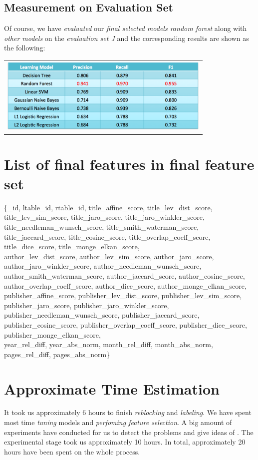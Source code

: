\documentclass[10pt, oneside]{article}
\begin{document}
\subsection*{Measurement on Evaluation Set}
Of course, we have \textit{evaluated} our \textit{final selected models random forest} along with \textit{other models}  on the \textit{evaluation set J} and the corresponding results are shown as the following:
\begin{table}[H]
\begin{tabular}{c}
\includegraphics[width=4in]{final_eval_score}
\end{tabular}
\end{table}
 
\section*{List of final features in final feature set}
\{\_id, 
ltable\_id,
rtable\_id,
title\_affine\_score,
title\_lev\_dist\_score,
title\_lev\_sim\_score,
title\_jaro\_score,
title\_jaro\_winkler\_score,
title\_needleman\_wunsch\_score,
title\_smith\_waterman\_score,
title\_jaccard\_score,
title\_cosine\_score,
title\_overlap\_coeff\_score,
title\_dice\_score,
title\_monge\_elkan\_score, \\
author\_lev\_dist\_score,
author\_lev\_sim\_score,
author\_jaro\_score,
author\_jaro\_winkler\_score,
author\_needleman\_wunsch\_score,
author\_smith\_waterman\_score,
author\_jaccard\_score,
author\_cosine\_score,
author\_overlap\_coeff\_score,
author\_dice\_score,
author\_monge\_elkan\_score,\\
publisher\_affine\_score,
publisher\_lev\_dist\_score,
publisher\_lev\_sim\_score,
publisher\_jaro\_score,
publisher\_jaro\_winkler\_score,
publisher\_needleman\_wunsch\_score,
publisher\_jaccard\_score,
publisher\_cosine\_score,
publisher\_overlap\_coeff\_score,
publisher\_dice\_score,
publisher\_monge\_elkan\_score,\\
year\_rel\_diff,
year\_abs\_norm,
month\_rel\_diff,
month\_abs\_norm,
pages\_rel\_diff, 
pages\_abs\_norm\}


\section*{Approximate Time Estimation}
It took us approximately 6 hours to finish \textit{reblocking} and \textit{labeling}. We have spent most time \textit{tuning} models and \textit{perfoming feature selection}. A big amount of experiments have conducted
for us to detect the problems and give ideas of . The experimental stage took us approximately 10 hours. In total, approximately 20 hours have been spent on the whole process.
\end{document}

